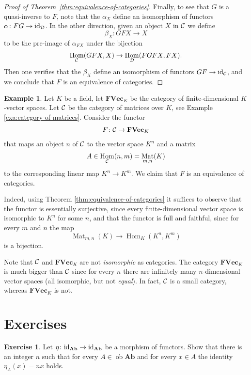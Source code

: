 \documentclass[11pt]{amsbook}
\DeclareMathOperator\Hom{Hom}
\DeclareMathOperator\Mat{Mat}
\DeclareMathOperator\ob{ob}
\def\id{{\rm id}}
\def\Ab{\mathbf{Ab}}
\def\FVec{\mathbf{FVec}}
\theoremstyle{plain}
\theoremstyle{definition}
\newtheorem{example}[theorem]{Example}
\newtheorem{exercise}{Exercise}
\begin{document}
\begin{proof}[Proof of Theorem~\ref{thm:equivalence-of-categories}]
Finally, to see that $G$ is a quasi-inverse to $F$, note that the $\alpha_X$ define an isomorphism of functors $\alpha\colon FG \to \id_{\cD}$. In the other direction, given an object $X$ in ${\mathcal{C}}$ we define
\[
	\beta_X \colon GFX \to X
\]
to be the pre-image of $\alpha_{FX}$ under the bijection
\[
	\Hom_\cC(GFX,X) \to \Hom_\cD(FGFX,FX).
\]
Then one verifies that the $\beta_X$ define an isomorphism of functors $GF \to \id_{\cC}$, and we conclude that $F$ is an equivalence of categories.
\end{proof}



\begin{example}
Let $K$ be a field, let $\FVec_K$ be the category of finite-dimensional $K$-vector spaces. Let ${\mathcal{C}}$ be the category of matrices over $K$, see Example \ref{exa:category-of-matrices}. Consider the functor
\[
	F\colon  \cC \to \FVec_K
\]
that maps an object $n$ of ${\mathcal{C}}$ to the vector space $K^n$ and a matrix
\[
	A \in \Hom_\cC(n,m) = \Mat_{m,n}(K)
\]
to the corresponding linear map $K^n \to K^m$. We claim that $F$ is an equivalence of categories.

Indeed, using Theorem \ref{thm:equivalence-of-categories} it suffices to observe that the functor is essentially surjective, since every finite-dimensional vector space is isomorphic to $K^n$ for some $n$, and that the functor is full and faithful, since for every $m$ and $n$ the map
\[
	\Mat_{m,n}(K) \to \Hom_K(K^n,K^m)
\]
is a bijection.

Note that ${\mathcal{C}}$ and $\FVec_K$ are not \emph{isomorphic} as categories. The category $\FVec_K$ is much bigger than ${\mathcal{C}}$ since for every $n$ there are infinitely many $n$-dimensional vector spaces (all isomorphic, but not \emph{equal}). In fact, ${\mathcal{C}}$ is a small category, whereas $\FVec_K$ is not.
\end{example}



\newpage
\section*{Exercises}




\begin{exercise}\label{exc:endo-identity-ab}
Let $\eta \colon \id_\Ab \to \id_\Ab$ be a morphism of functors. Show that there is an integer $n$ such that  for every $A \in \ob \Ab$ and for every $x \in A$ the identity $\eta_A(x) =nx$ holds.
\end{exercise}
\end{document}
